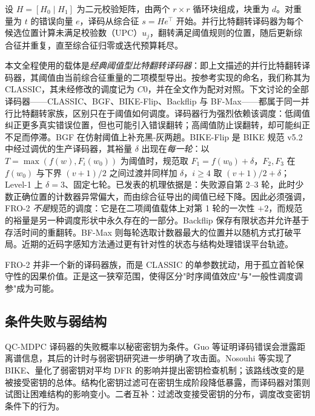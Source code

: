 \documentclass[UTF8,a4paper,10pt,twocolumn]{ctexart}
\begin{document}
设 $H=[H_0\mid H_1]$ 为二元校验矩阵，由两个 $r\times r$ 循环块组成，块重为 $d$。对重量为 $t$ 的错误向量 $e$，译码从综合征 $s=He^{\top}$ 开始。并行比特翻转译码器为每个候选位置计算未满足校验数（UPC）$u_j$，翻转满足阈值规则的位置，随后更新综合征并重复，直至综合征归零或迭代预算耗尽。

本文全程使用的载体是\emph{经典阈值型比特翻转译码器}：即上文描述的并行比特翻转译码器，其阈值由当前综合征重量的二项模型导出\cite{misoczki2013mdpc,vasseur2021thesis}。按参考实现的命名，我们称其为 CLASSIC，其未经修改的调度记为 $C0$，并在全文作为配对对照。下文讨论的全部译码器——CLASSIC、BGF、BIKE-Flip、Backflip 与 BF-Max——都属于同一并行比特翻转家族，区别只在于阈值如何调度。译码器行为强烈依赖该调度：低阈值纠正更多真实错误位置，但也可能引入错误翻转；高阈值防止误翻转，却可能纠正不足而停滞。BGF 在仿射阈值上补充黑-灰两趟\cite{drucker2020shades}。BIKE-Flip 是 BIKE 规范 v5.2 中经过调优的生产译码器\cite{bike2024spec}，其裕量 $\delta$ 出现在\emph{每一轮}：以 $T=\max(f(w),F_i(w_0))$ 为阈值时，规范取 $F_1=f(w_0)+\delta$，$F_2,F_3$ 在 $f(w_0)$ 与下界 $(v{+}1)/2$ 之间过渡并同样加 $\delta$，$i\ge4$ 取 $(v{+}1)/2+\delta$；Level-1 上 $\delta=3$、固定七轮。已发表的机理依据是：失败源自第 2--3 轮，此时少数正确位置的计数器异常偏大，而由综合征导出的阈值已经下降\cite{sendrier2024seminar}。因此必须强调，FRO-2 \emph{不是}规范的调度：它是在二项阈值载体上对第 1 轮的一次性 $+2$，而规范的裕量是另一种调度形状中永久存在的一部分。Backflip 保存有限状态并允许基于存活时间的重翻转\cite{sendrier2020lowdfr}。BF-Max 则每轮选取计数器最大的位置并以随机方式打破平局\cite{baldelli2025bfmax}。近期的近码字感知方法通过更有针对性的状态与结构处理错误平台轨迹\cite{baldelli2026ncw,santini2026flip}。

FRO-2 并非一个新的译码器族，而是 CLASSIC 的单参数扰动，用于孤立首轮保守性的因果价值。正是这一狭窄范围，使得区分"时序阈值效应"与"一般性调度调参"成为可能。

\subsection{条件失败与弱结构}

QC-MDPC 译码器的失败概率以秘密密钥为条件。Guo 等证明译码错误会泄露距离谱信息\cite{guo2016key}，其后的计时与弱密钥研究进一步明确了攻击面\cite{eaton2018timing,wang2023weak,gellersen2025}。Nosouhi 等实现了 BIKE、量化了弱密钥对平均 DFR 的影响并提出密钥检查机制；该路线改变的是被接受密钥的总体\cite{nosouhi2023weakkey}。结构化密钥过滤可在密钥生成阶段降低暴露\cite{matthews2025combinatorial}，而译码器对策则试图让困难结构的影响变小。二者互补：过滤改变接受密钥的分布，调度改变密钥条件下的行为。
\end{document}
